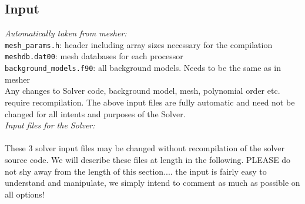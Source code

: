 \documentclass[11pt,letter,fleqn,english,notitlepage]{article}
\begin{document}
\subsection{Input}

\textit{Automatically taken from mesher:} \\
{\tt mesh\_params.h}: header including array sizes necessary for the compilation\\
{\tt meshdb.dat00\*}: mesh databases for each processor\\
{\tt background\_models.f90}: all background models. Needs to be the same as in mesher\\

\noindent Any changes to Solver code, background model, mesh, polynomial order etc. require 
recompilation. The above input files are fully automatic and need not be changed for all intents 
and purposes of the Solver.\\

\noindent \textit{Input files for the Solver:} \\
\\
These 3 solver input files may be changed without recompilation of the solver 
source code. We will describe these files at length in the following. PLEASE do not shy away from the 
length of this section.... the input is fairly easy to understand and manipulate, 
we simply intend to comment as much as possible on all options!\\
\end{document}
